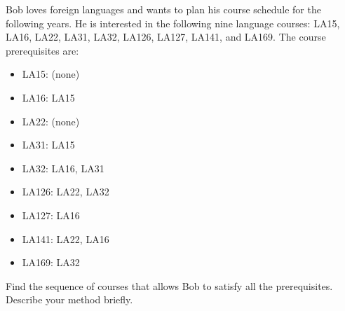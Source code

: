 Bob loves foreign languages and wants to plan his course schedule for
the following years. He is interested in the following nine language
courses: LA15, LA16, LA22, LA31, LA32, LA126, LA127, LA141, and LA169.
The course prerequisites are:

\begin{itemize}
\item  LA15: (none)
\item  LA16: LA15
\item  LA22: (none)
\item  LA31: LA15
\item  LA32: LA16, LA31
\item  LA126: LA22, LA32
\item  LA127: LA16
\item  LA141: LA22, LA16
\item  LA169: LA32
\end{itemize}

Find the sequence of courses that allows Bob to satisfy all the
prerequisites. Describe your method briefly.
